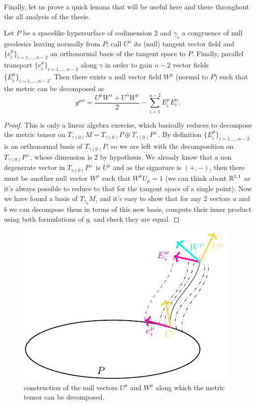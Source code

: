 Finally, let us prove a quick lemma that will be useful here and there throughout the all analysis of the thesis.
\begin{lemma}
	\label{lemma:metric-decomposition}
	Let \(P\) be a spacelike hypersurface of codimension \(2\) and \(\gamma_s\) a congruence of null geodesics leaving normally from \(P\); call \(U^{\mu}\) its (null) tangent vector field and \(\{e_i^{\mu}\}_{i = 1, \ldots, n - 2}\) an orthonormal basis of the tangent space to \(P\). Finally, parallel transport \(\{e_i^{\mu}\}_{i = 1, \ldots, n - 2}\) along \(\gamma\) in order to gain \(n - 2\) vector fields \(\{E_i^{\mu}\}_{i = 1, \ldots, n - 2}\). Then there exists a null vector field \(W^{\mu}\) (normal to \(P\)) such that the metric can be decomposed as
	\begin{equation}
		g^{\mu\alpha} = \frac{U^{\mu}W^{\alpha} + U^{\alpha}W^{\mu}}{2} - \sum_{i=1}^{n - 2}E_i^{\mu}E_i^{\alpha}.
	\end{equation}
\end{lemma}

\begin{proof}
	This is only a linear algebra exercise, which basically reduces to decompose the metric tensor on \(T_{\gamma(0)}M = T_{\gamma(0)}P \oplus T_{\gamma(0)}P^{\perp}\). By definition \(\{E_i^{\mu}\}_{i = 1, \ldots, n - 2}\) is an orthonormal basis of \(T_{\gamma(0)}P\), so we are left with the decomposition on \(T_{\gamma(0)}P^{\perp}\), whose dimension is \(2\) by hypothesis.
	We already know that a non degenerate vector in \(T_{\gamma(0)}P^{\perp}\) is \(U^{\mu}\) and as the signature is \((+, -)\), then there must be another null vector \(W^{\mu}\) such that \(W^{\mu}U_{\mu} = 1\) (we can think about \({\mathbb{R}}^{1,1}\) as it's always possible to reduce to that for the tangent space of a single point). Now we have found a basis of \(T_{\gamma_0}M\), and it's easy to show that for any \(2\) vectors \(a\) and \(b\) we can decompose them in terms of this new basis, compute their inner product using both formulations of \(g\), and check they are equal.
\end{proof}

\begin{figure}
	\caption[]{construction of the null vectors \(U^{\mu}\) and \(W^{\mu}\) along which the metric tensor can be decomposed.}
	\label{fig:metric-decomposition}
	\centering
	\includegraphics[scale=1.5]{Immagini/metric-decomposition/metric-decomposition.pdf}
\end{figure}


